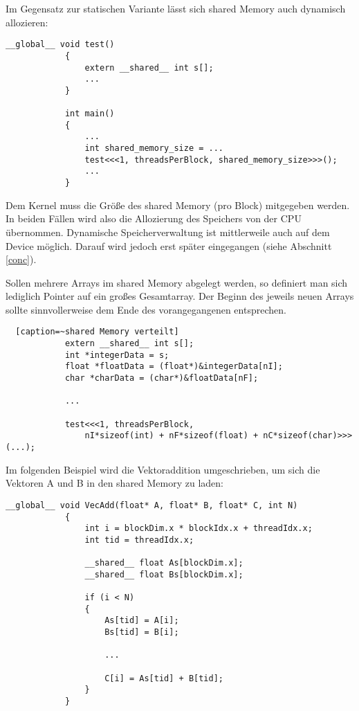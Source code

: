 		Im Gegensatz zur statischen Variante lässt sich \gls{shared Memory} auch dynamisch allozieren:  		
  		\begin{lstlisting}[caption=~shared Memory dynamisch]
			__global__ void test()
			{
  				extern __shared__ int s[];
  				...
			}
			
			int main()
			{
				...
				int shared_memory_size = ...
				test<<<1, threadsPerBlock, shared_memory_size>>>();
				...
			}			
  		\end{lstlisting}
  		
        Dem \Gls{Kernel} muss die Größe des \gls{shared Memory} (pro \Gls{Block}) mitgegeben werden. In beiden Fällen wird also die Allozierung des Speichers von der CPU übernommen.  Dynamische Speicherverwaltung ist mittlerweile auch auf dem Device möglich. Darauf wird jedoch erst später eingegangen (siehe Abschnitt \ref{conc}). 
        
        Sollen mehrere Arrays im \gls{shared Memory} abgelegt werden, so definiert man sich lediglich Pointer auf ein großes Gesamtarray. Der Beginn des jeweils neuen Arrays sollte sinnvollerweise dem Ende des vorangegangenen entsprechen.  	  		
  		\begin{lstlisting}	[caption=~shared Memory verteilt]	
			extern __shared__ int s[];
			int *integerData = s;                        
			float *floatData = (float*)&integerData[nI];
			char *charData = (char*)&floatData[nF];
			
			...
			
			test<<<1, threadsPerBlock, 
				nI*sizeof(int) + nF*sizeof(float) + nC*sizeof(char)>>>(...);
		\end{lstlisting}

		Im folgenden Beispiel wird die Vektoraddition umgeschrieben, um sich die Vektoren A und B in den \gls{shared Memory} zu laden:	
		
		\begin{lstlisting}[caption=~Vektoraddition shared Memory]
			__global__ void VecAdd(float* A, float* B, float* C, int N)
			{
    			int i = blockDim.x * blockIdx.x + threadIdx.x;
    			int tid = threadIdx.x;
    			
    			__shared__ float As[blockDim.x];
    			__shared__ float Bs[blockDim.x];
    			
    			if (i < N)
    			{
    			    As[tid] = A[i];
    			    Bs[tid] = B[i];
    			    
    			    ...
    			    
        			C[i] = As[tid] + B[tid];
        		}
			}
		\end{lstlisting}
		
